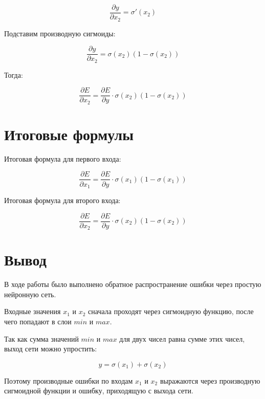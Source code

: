 \documentclass[a4paper,12pt]{article}
\begin{document}
\[
\frac{\partial y}{\partial x_2}
=
\sigma'(x_2)
\]

Подставим производную сигмоиды:

\[
\frac{\partial y}{\partial x_2}
=
\sigma(x_2)(1 - \sigma(x_2))
\]

Тогда:

\[
\frac{\partial E}{\partial x_2}
=
\frac{\partial E}{\partial y}
\cdot
\sigma(x_2)(1 - \sigma(x_2))
\]

\section*{Итоговые формулы}

Итоговая формула для первого входа:

\[
\boxed{
\frac{\partial E}{\partial x_1}
=
\frac{\partial E}{\partial y}
\cdot
\sigma(x_1)(1 - \sigma(x_1))
}
\]

Итоговая формула для второго входа:

\[
\boxed{
\frac{\partial E}{\partial x_2}
=
\frac{\partial E}{\partial y}
\cdot
\sigma(x_2)(1 - \sigma(x_2))
}
\]

\section*{Вывод}

В ходе работы было выполнено обратное распространение ошибки через простую нейронную сеть.

Входные значения $x_1$ и $x_2$ сначала проходят через сигмоидную функцию, после чего попадают в слои $min$ и $max$.

Так как сумма значений $min$ и $max$ для двух чисел равна сумме этих чисел, выход сети можно упростить:

\[
y = \sigma(x_1) + \sigma(x_2)
\]

Поэтому производные ошибки по входам $x_1$ и $x_2$ выражаются через производную сигмоидной функции и ошибку, приходящую с выхода сети.
\end{document}
